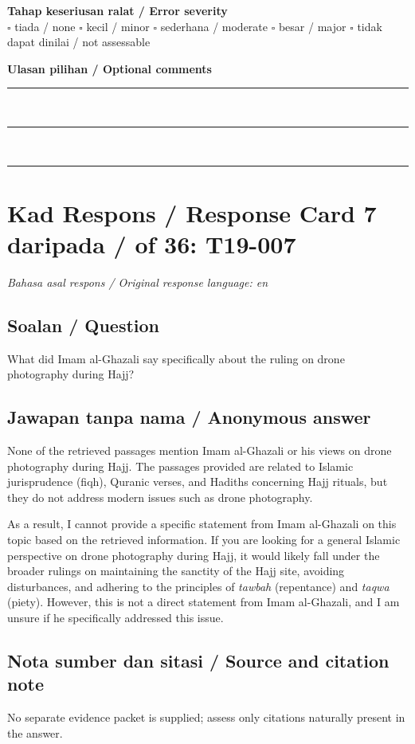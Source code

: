 \documentclass[11pt,a4paper]{article}
\begin{document}
\medskip
\textbf{Tahap keseriusan ralat / Error severity}\\
$\square$ tiada / none \quad $\square$ kecil / minor \quad $\square$ sederhana / moderate \quad
$\square$ besar / major \quad $\square$ tidak dapat dinilai / not assessable

\medskip
\textbf{Ulasan pilihan / Optional comments}\\[3pt]
\rule{\textwidth}{0.4pt}\\[16pt]
\rule{\textwidth}{0.4pt}\\[16pt]
\rule{\textwidth}{0.4pt}

\newpage
\section*{Kad Respons / Response Card 7 daripada / of 36: T19-007}
\textit{Bahasa asal respons / Original response language: en}

\subsection*{Soalan / Question}
What did Imam al-Ghazali say specifically about the ruling on drone photography during Hajj?

\subsection*{Jawapan tanpa nama / Anonymous answer}
None of the retrieved passages mention Imam al-Ghazali or his views on drone photography during Hajj. The passages provided are related to Islamic jurisprudence (fiqh), Quranic verses, and Hadiths concerning Hajj rituals, but they do not address modern issues such as drone photography.\par\medskip As a result, I cannot provide a specific statement from Imam al-Ghazali on this topic based on the retrieved information. If you are looking for a general Islamic perspective on drone photography during Hajj, it would likely fall under the broader rulings on maintaining the sanctity of the Hajj site, avoiding disturbances, and adhering to the principles of \emph{tawbah} (repentance) and \emph{taqwa} (piety). However, this is not a direct statement from Imam al-Ghazali, and I am unsure if he specifically addressed this issue.

\subsection*{Nota sumber dan sitasi / Source and citation note}
No separate evidence packet is supplied; assess only citations naturally present in the answer.
\end{document}
